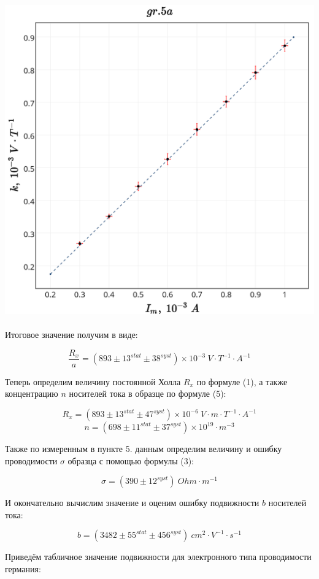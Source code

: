 \includegraphics[scale = 0.20]{my_plot5a.png}\\
\\
\newpage
Итоговое значение получим в виде:

$$\boxed{\frac{R_x}{a} = (893 \pm 13^{stat} \pm 38^{syst}) \times 10^{-3}~V \cdot T^{-1} \cdot A^{-1}}$$

Теперь определим величину постоянной Холла $R_x$ по формуле (1), а также концентрацию $n$ носителей тока в образце по формуле (5):

$$\boxed{R_x = (893 \pm 13^{stat} \pm 47^{syst}) \times 10^{-6}~V \cdot m \cdot T^{-1} \cdot A^{-1}}$$
$$\boxed{n = (698 \pm 11^{stat} \pm 37^{syst}) \times 10^{19} \cdot m^{-3}}$$

Также по измеренным в пункте 5. данным определим величину и ошибку проводимости $\sigma$ образца с помощью формулы (3):

$$\boxed{\sigma = (390 \pm 12^{syst})~Ohm\cdot m^{-1}}$$

И окончательно вычислим значение и оценим ошибку подвижности $b$ носителей тока:

$$\boxed{b = (3482 \pm 55^{stat} \pm 456^{syst})~cm^2 \cdot V^{-1} \cdot s^{-1}}$$

Приведём табличное значение подвижности для электронного типа проводимости германия:

